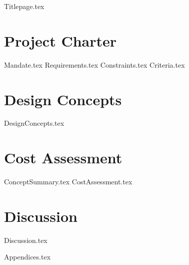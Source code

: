 \documentclass[letterpaper,12pt,onecolumn,titlepage,twoside]{article}
\begin{document}
{Titlepage.tex}

\clearpage\mbox{}\clearpage %


\tableofcontents

\newpage

\listoffigures
\listoftables

\newpage

\clearpage\mbox{}\clearpage %


\section{Project Charter} \label{sec:charter}
{Mandate.tex}
{Requirements.tex}
{Constraints.tex}
{Criteria.tex}

\newpage

\section{Design Concepts} \label{sec:design_concepts}
{DesignConcepts.tex}

\newpage

\section{Cost Assessment} \label{sec:cost_assessment}
{ConceptSummary.tex}
{CostAssessment.tex}

\newpage

\section{Discussion} \label{sec:discussion}
{Discussion.tex}

\newpage




\newpage

\begin{appendices}
    {Appendices.tex}
\end{appendices}
\end{document}
